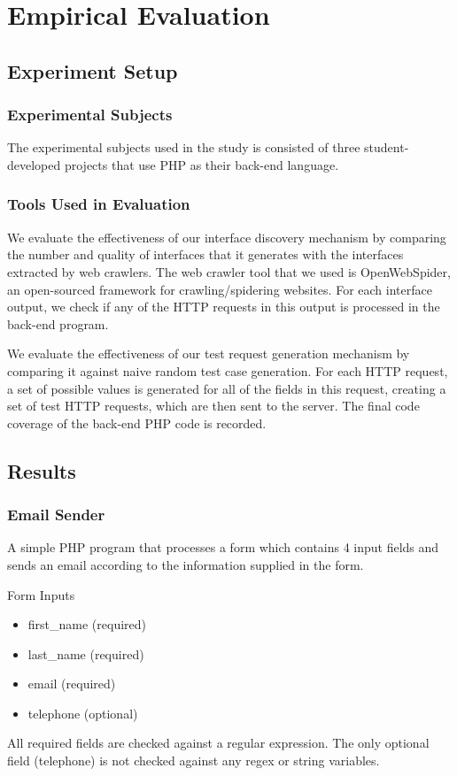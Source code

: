 \chapter{Empirical Evaluation}

\section{Experiment Setup}
\subsection{Experimental Subjects}
The experimental subjects used in the study is consisted of three student-developed projects that use PHP as their back-end language.

\subsection{Tools Used in Evaluation}
We evaluate the effectiveness of our interface discovery mechanism by comparing the number and quality of interfaces that it generates with the interfaces extracted by web crawlers. The web crawler tool that we used is OpenWebSpider, an open-sourced framework for crawling/spidering websites. For each interface output, we check if any of the HTTP requests in this output is processed in the back-end program.

We evaluate the effectiveness of our test request generation mechanism by comparing it against naive random test case generation. For each HTTP request, a set of possible values is generated for all of the fields in this request, creating a set of test HTTP requests, which are then sent to the server. The final code coverage of the back-end PHP code is recorded.

\section{Results}

\subsection{Email Sender}
A simple PHP program that processes a form which contains 4 input fields and sends an email according to the information supplied in the form. 

Form Inputs
\begin{itemize}
\item first\_name (required)
\item last\_name (required)
\item email (required)
\item telephone (optional)
\end{itemize}
All required fields are checked against a regular expression. The only optional field (telephone) is not checked against any regex or string variables.

